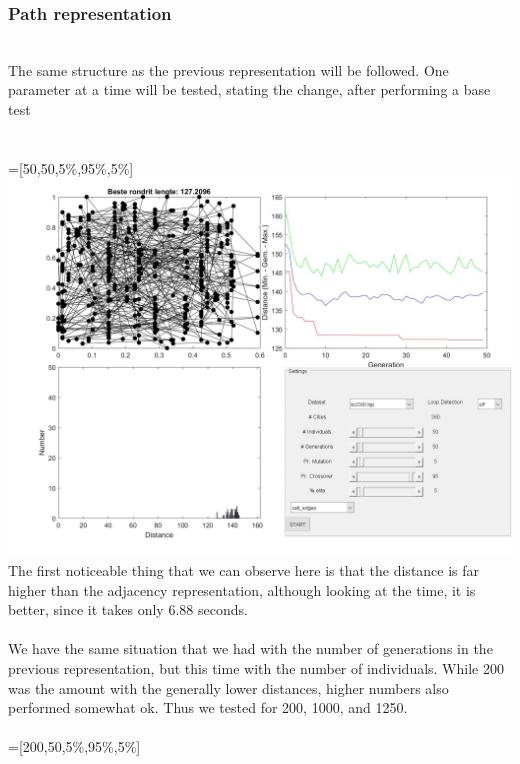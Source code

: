 \subsubsection{Path representation}
\\
The same structure as the previous representation will be followed. One
parameter at a time will be tested, stating the change, after
performing a base test\\
\\
\\
 =[50,50,5\%,95\%,5\%] \\
\includegraphics[width=\textwidth]{img/specific/order_crossover/general_1.jpg}\\
The first noticeable thing that we can observe here is that the distance
is far higher than the adjacency representation, although looking at the
time, it is better, since it takes only 6.88 seconds.\\
\\
We have the same situation that we had with the number of generations in the
previous representation, but this time with the number of individuals. While
200 was the amount with the generally lower distances, higher numbers also
performed somewhat ok. Thus we tested for 200, 1000, and 1250.\\
\\
 =[200,50,5\%,95\%,5\%]\\

